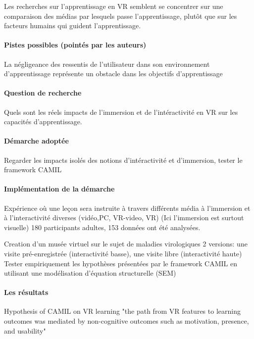 Les recherches sur l'apprentissage en VR semblent se concentrer sur une comparaison des médias par lesquels passe l'apprentissage,
plutôt que sur les facteurs humains qui guident l'apprentissage.

\paragraph{Pistes possibles (pointés par les auteurs)}

La négligeance des ressentis de l'utilisateur dans son environnement d'apprentissage représente un obstacle dans les objectifs d'apprentissage

\paragraph{Question de recherche}

Quels sont les réels impacts de l'immersion et de l'intéractivité en VR sur les capacités d'apprentissage.

\paragraph{Démarche adoptée}

Regarder les impacts isolés des notions d'intéractivité et d'immersion,
tester le framework CAMIL

\paragraph{Implémentation de la démarche}

Expérience où une leçon sera instruite à travers différents média à l'immersion et à l'interactivité diverses (vidéo,PC, VR-video, VR)
(Ici l'immersion est surtout visuelle)
180 participants adultes, 153 données ont été analysées.

Creation d'un musée virtuel sur le sujet de maladies virologiques
2 versions: une visite pré-enregistrée (interactivité basse), une visite libre (interactivité haute)
Tester empiriquement les hypothèses présentées par le framework CAMIL en utilisant une modélisation d'équation structurelle (SEM)


\paragraph{Les résultats}
\lipsum[1]

Hypothesis of CAMIL on VR learning
"the path from VR features to learning outcomes was mediated by non-cognitive outcomes such as motivation, presence, and usability"


